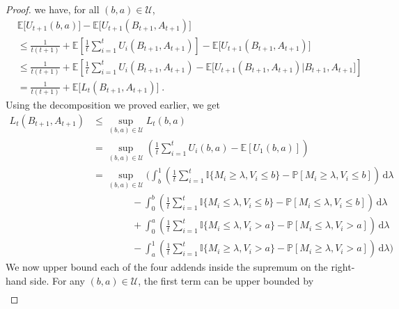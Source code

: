 \documentclass[final,12pt]{colt2025}
\newcommand{\cU}{\mathcal{U}}
\newcommand{\E}{\mathbb{E}}
\newcommand{\Pb}{\mathbb{P}}
\newcommand{\lrb}[1]{\left(#1\right)}
\newcommand{\lsb}[1]{\left[#1\right]}
\newcommand{\bsb}[1]{\bigl[#1\bigr]}
\newcommand{\one}[1]{\mathbb{I}\{#1\}}
\newcommand{\dif}{\,\mathrm{d}}
\newcommand{\Util}{U}
\newcommand{\nP}{M}
\newcommand{\nZ}{V}
\newcommand{\nB}{B}
\newcommand{\nb}{b}
\newcommand{\nS}{A}
\newcommand{\ns}{a}
\begin{document}
\begin{proof}
    we have, for all $(\nb,\ns)\in\cU$,
    \begin{align*}
        &
            \E\bsb{ \Util_{t+1}(\nb, \ns) } - \E\bsb{ \Util_{t+1}(\nB_{t+1}, \nS_{t+1}) }
        \\ &\le
            \frac{1}{t(t+1)} + \E \lsb{ \frac{1}{t} \sum_{i=1}^t \Util_i(\nB_{t+1}, \nS_{t+1}) }
            - \E \bsb{ \Util_{t+1}(\nB_{t+1}, \nS_{t+1}) }
        \\ &\le
            \frac{1}{t(t+1)} + \E \lsb{ \frac{1}{t} \sum_{i=1}^t \Util_i(\nB_{t+1}, \nS_{t+1})
            - \E \bsb{ \Util_{t+1}(\nB_{t+1}, \nS_{t+1}) | \nB_{t+1}, \nS_{t+1} } }
        \\ & =
            \frac{1}{t(t+1)} + \E \bsb{ L_t(\nB_{t+1}, \nS_{t+1}) } \;.
    \end{align*}
    Using the decomposition we proved earlier, we get
    \begin{align*}
        L_t(\nB_{t+1}, \nS_{t+1})
    &\le
        \sup_{(\nb,\ns)\in\cU} L_t(\nb, \ns)
    \\
    &=
        \sup_{(\nb,\ns)\in\cU}
        \lrb{
            \frac{1}{t} \sum_{i=1}^t \Util_{i}(\nb, \ns) - \E[\Util_1(\nb, \ns)]
        } 
    \\
    &=
        \sup_{(\nb,\ns)\in\cU}
        \Bigg(
            \int_{\nb}^{1} \lrb{
                \frac{1}{t} \sum_{i=1}^t \one{ \nP_i \ge \lambda, \nZ_i \le \nb }
                - \Pb[ \nP_i \ge \lambda, \nZ_i \le \nb ]
            } \dif\lambda
        \\ & \qquad\qquad -
            \int_{0}^{\nb} \lrb{
                \frac{1}{t} \sum_{i=1}^t \one{ \nP_i \le \lambda, \nZ_i \le \nb }
                - \Pb[ \nP_i \le \lambda, \nZ_i \le \nb ]
            } \dif\lambda
        \\ & \qquad\qquad +
            \int_{0}^{\ns} \lrb{
                \frac{1}{t} \sum_{i=1}^t \one{ \nP_i \le \lambda, \nZ_i > \ns }
                - \Pb[ \nP_i \le \lambda, \nZ_i > \ns ]
            } \dif\lambda
        \\ & \qquad\qquad -
            \int_{\ns}^{1} \lrb{
                \frac{1}{t} \sum_{i=1}^t \one{ \nP_i \ge \lambda, \nZ_i > \ns }
                - \Pb[ \nP_i \ge \lambda, \nZ_i > \ns ]
            } \dif\lambda
        \Bigg)
    \end{align*}
    We now upper bound each of the four addends inside the supremum on the right-hand side.
    For any $(\nb,\ns) \in\cU$, the first term can be upper bounded by
    \begin{multline*}

\end{multline*}
\end{proof}
\end{document}
